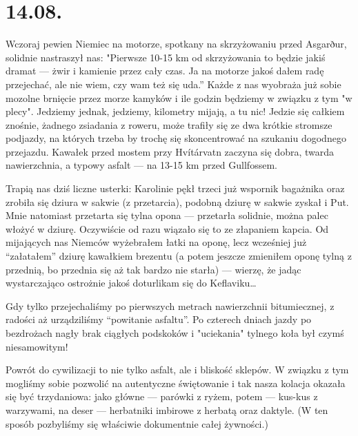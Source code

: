 \chapter*{14.08.}

Wczoraj pewien Niemiec na motorze, spotkany na skrzyżowaniu przed Asgarður, solidnie nastraszył nas: "Pierwsze 10-15 km od skrzyżowania to będzie jakiś dramat --- żwir i kamienie przez cały czas. Ja na motorze jakoś dałem radę przejechać, ale nie wiem, czy wam też się uda.” Każde z nas wyobraża już sobie mozolne brnięcie przez morze kamyków i ile godzin będziemy w związku z tym "w plecy". Jedziemy jednak, jedziemy, kilometry mijają, a tu nic! Jedzie się całkiem znośnie, żadnego zsiadania z roweru, może trafiły się ze dwa krótkie stromsze podjazdy, na których trzeba by trochę się skoncentrować na szukaniu dogodnego przejazdu. Kawałek przed mostem przy Hvítárvatn zaczyna się dobra, twarda nawierzchnia, a typowy asfalt --- na 13-15 km przed Gullfossem.


Trapią nas dziś liczne usterki: Karolinie pękł trzeci już wspornik bagażnika oraz zrobiła się dziura w sakwie (z przetarcia), podobną dziurę w sakwie zyskał i Put. Mnie natomiast przetarta się tylna opona --- przetarła solidnie, można palec włożyć w dziurę. Oczywiście od razu wiązało się to ze złapaniem kapcia. Od mijających nas Niemców wyżebrałem łatki na oponę, lecz wcześniej już “załatałem” dziurę kawałkiem brezentu (a potem jeszcze zmieniłem oponę tylną z przednią, bo przednia się aż tak bardzo nie starła) --- wierzę, że jadąc wystarczająco ostrożnie jakoś doturlikam się do Keflaviku…


Gdy tylko przejechaliśmy po pierwszych metrach nawierzchnii bitumiecznej, z radości aż urządziliśmy “powitanie asfaltu”. Po czterech dniach jazdy po bezdrożach nagły brak ciągłych podskoków i "uciekania" tylnego koła był czymś niesamowitym!

Powrót do cywilizacji to nie tylko asfalt, ale i bliskość sklepów. W związku z tym mogliśmy sobie pozwolić na autentyczne świętowanie i tak nasza kolacja okazała się być trzydaniowa: jako główne --- parówki z ryżem, potem --- kus-kus z warzywami, na deser --- herbatniki imbirowe z herbatą oraz daktyle. (W ten sposób pozbyliśmy się właściwie dokumentnie całej żywności.)

